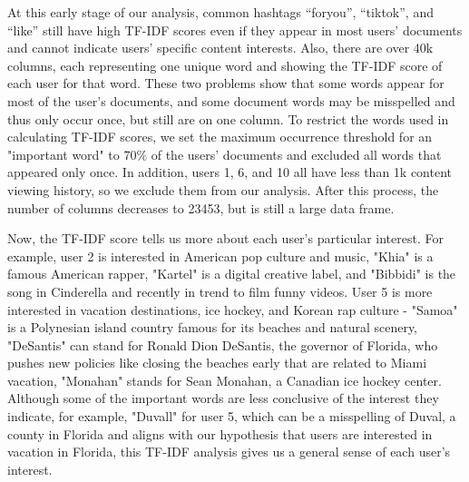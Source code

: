 \documentclass[acmtog]{acmart}
\begin{document}
At this early stage of our analysis, common hashtags “foryou”, “tiktok”, and “like” still have high TF-IDF scores even if they appear in most users' documents and cannot indicate users' specific content interests. Also, there are over 40k columns, each representing one unique word and showing the TF-IDF score of each user for that word. These two problems show that some words appear for most of the user's documents, and some document words may be misspelled and thus only occur once, but still are on one column. To restrict the words used in calculating TF-IDF scores, we set the maximum occurrence threshold for an "important word" to 70\% of the users' documents and excluded all words that appeared only once. In addition, users 1, 6, and 10 all have less than 1k content viewing history, so we exclude them from our analysis. After this process, the number of columns decreases to 23453, but is still a large data frame.

Now, the TF-IDF score tells us more about each user's particular interest. For example, user 2 is interested in American pop culture and music, "Khia" is a famous American rapper, "Kartel" is a digital creative label, and "Bibbidi" is the song in Cinderella and recently in trend to film funny videos. User 5 is more interested in vacation destinations, ice hockey, and Korean rap culture - "Samoa" is a Polynesian island country famous for its beaches and natural scenery, "DeSantis" can stand for Ronald Dion DeSantis, the governor of Florida, who pushes new policies like closing the beaches early that are related to Miami vacation, "Monahan" stands for Sean Monahan, a Canadian ice hockey center. Although some of the important words are less conclusive of the interest they indicate, for example, "Duvall" for user 5, which can be a misspelling of Duval, a county in Florida and aligns with our hypothesis that users are interested in vacation in Florida, this TF-IDF analysis gives us a general sense of each user's interest.
\end{document}
